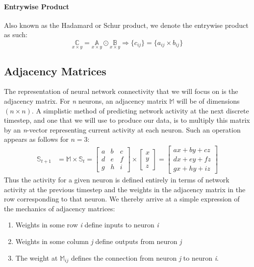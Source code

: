 \paragraph{Entrywise Product}
Also known as the Hadamard or Schur product, we denote the entrywise product as 
such:
\begin{equation}
	\underset{x \times y}{\mathbb{C}} = \underset{x \times y}{\mathbb{A}} \odot 
	\underset{x \times y}{\mathbb{B}} \Rightarrow \{c_{ij}\} = \{a_{ij} \times 
	b_{ij}\}
\end{equation}

\subsection{Adjacency Matrices}
\label{subsec:adjacency}
The representation of neural network connectivity that we will focus on is the 
adjacency matrix. For \textit{n} neurons, an adjacency matrix $\mathbb{M}$ will 
be of dimensions $(n \times n)$. A simplistic method of predicting network 
activity at the next discrete timestep, and one that we will use to produce our 
data, is to multiply this matrix by an \textit{n}-vector representing current 
activity at each neuron.  Such an operation appears as follows for $n=3$:
\begin{align}
	\mathbb{S}_{t+1} &= \mathbb{M}\times\mathbb{S}_t =
	\begin{bmatrix}
		a & b & c\\
		d & e & f\\
		g & h & i
	\end{bmatrix}
	\times
	\begin{bmatrix}
		x\\
		y\\
		z
	\end{bmatrix}
	=
	\begin{bmatrix}
		ax + by + cz\\
		dx + ey + fz\\
		gx + hy + iz
	\end{bmatrix}
\end{align}
Thus the activity for a given neuron is defined entirely in terms of network 
activity at the previous timestep and the weights in the adjacency matrix in the 
row corresponding to that neuron. We thereby arrive at a simple expression of 
the mechanics of adjacency matrices: 

\begin{enumerate}
	\item Weights in some row \textit{i} define inputs to neuron \textit{i}
	\item Weights in some column \textit{j} define outputs from neuron 
		\textit{j}
	\item The weight at $\mathbb{M}_{ij}$ defines the connection from neuron 
		\textit{j} to neuron \textit{i}.  \end{enumerate}

